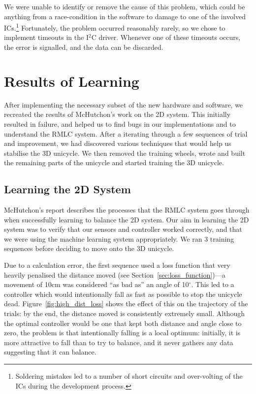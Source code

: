 \documentclass{IIBproject}
\begin{document}
We were unable to identify or remove the cause of this problem, which could be
anything from a race-condition in the software to damage to one of the
involved ICs.\footnote{Soldering mistakes led to a number of short circuits and
over-volting of the ICs during the development process.} Fortunately, the
problem occurred reasonably rarely, so we chose to implement timeouts in the
I$^2$C driver. Whenever one of these timeouts occurs, the error is
signalled, and the data can be discarded.

\section{Results of Learning}
\label{sec:learning_results}

After implementing the necessary subset of the new hardware and software, we
recreated the results of McHutchon's work on the 2D system. This initially
resulted in failure, and helped us to find bugs in our implementations and to
understand the RMLC system. After a iterating through a few sequences of
trial and improvement, we had discovered various techniques that would help us
stabilise the 3D unicycle. We then removed the training wheels, wrote and
built the remaining parts of the unicycle and started training the 3D
unicycle.

\subsection{Learning the 2D System}

McHutchon's report describes the processes that the RMLC system goes
through when successfully learning to balance the 2D system. Our aim in
learning the 2D system was to verify that our sensors and controller worked
correctly, and that we were using the machine learning system appropriately.
We ran 3 training sequences before deciding to move onto the 3D unicycle.

Due to a calculation error, the first sequence used a loss function that very
heavily penalised the distance moved (see Section~\ref{sec:loss_function})---a
movement of 10cm was considered ``as bad as'' an angle of 10$^\circ$. This led
to a controller which would intentionally fall as fast as possible to stop the
unicycle dead. Figure~\ref{fig:high_dist_loss} shows the effect of this on the
trajectory of the trials: by the end, the distance moved is consistently
extremely small. Although the optimal controller would be one that kept both
distance and angle close to zero, the problem is that intentionally falling is
a local optimum: initially, it is more attractive to fall than to try to
balance, and it never gathers any data suggesting that it can balance.
\end{document}
